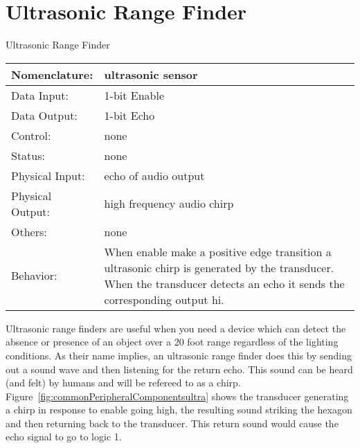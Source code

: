                         \section{Ultrasonic Range Finder}
                            \label{page:ultrasonic}
                            \begin{buildingblock}{Ultrasonic Range Finder}
                                \begin{tabular}{|l|p{3.5in}|} \hline
                                    Nomenclature:  & ultrasonic sensor  \\ \hline
                                    Data Input:    & 1-bit Enable     \\ \hline
                                    Data Output:   & 1-bit Echo   \\ \hline
                                    Control:       & none           \\ \hline
                                    Status:        & none                                   \\ \hline
                                    Physical Input:& echo of audio output        \\ \hline
                                    Physical Output:& high frequency audio chirp        \\ \hline
                                    Others:        & none                   \\ \hline
                                    Behavior:      & When enable make a positive edge transition
                                    a ultrasonic chirp is generated by the transducer.  When the
                                    transducer detects an echo it sends the corresponding output hi. \\ \hline
                                \end{tabular}
                            \end{buildingblock}

                            Ultrasonic range finders are useful when you need a device which
                            can detect the absence or presence of an object over a 20 foot
                            range regardless of the lighting conditions.   As their name implies,
                            an ultrasonic range finder does this by sending out a sound wave
                            and then listening for the return echo.  This sound can be heard (and
                            felt) by humans and will be refereed to as a chirp.
                            Figure~\ref{fig:commonPeripheralComponentsultra} shows the transducer generating a chirp in
                            response to enable going high, the resulting sound striking the
                            hexagon and then returning back to the transducer.  This return
                            sound would cause the echo signal to go to logic 1.

